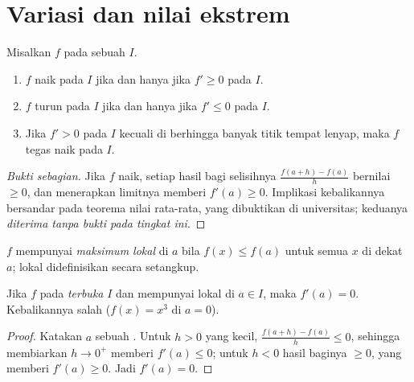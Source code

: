 \section{Variasi dan nilai ekstrem}

\begin{theorem}\label{thm:g12:deriv:variations}
Misalkan $f$  pada sebuah  $I$.
\begin{enumerate}
  \item $f$ naik pada $I$ jika dan hanya jika $f' \geq 0$ pada $I$.
  \item $f$ turun pada $I$ jika dan hanya jika $f' \leq 0$ pada $I$.
  \item Jika $f' > 0$ pada $I$ kecuali di berhingga banyak titik tempat
         lenyap, maka $f$ tegas naik pada $I$.
\end{enumerate}
\end{theorem}

\begin{proof}[Bukti sebagian]
Jika $f$ naik, setiap hasil bagi selisihnya
$\frac{f(a+h)-f(a)}{h}$ bernilai $\geq 0$, dan menerapkan limitnya memberi
$f'(a) \geq 0$. Implikasi kebalikannya bersandar pada teorema nilai rata-rata,
yang dibuktikan di universitas; keduanya \emph{diterima tanpa bukti pada tingkat ini}.
\end{proof}

\begin{definition}\label{def:g12:deriv:extremum}
$f$ mempunyai \emph{maksimum lokal} di $a$ bila
$f(x) \leq f(a)$ untuk semua $x$ di dekat $a$;  lokal didefinisikan
secara setangkup.
\end{definition}

\begin{proposition}\label{prop:g12:deriv:critical}
Jika $f$  pada  \emph{terbuka} $I$ dan mempunyai
 lokal di $a \in I$, maka $f'(a) = 0$. Kebalikannya salah
($f(x) = x^3$ di $a = 0$).
\end{proposition}

\begin{proof}
Katakan $a$ sebuah . Untuk $h > 0$ yang kecil,
$\frac{f(a+h)-f(a)}{h} \leq 0$, sehingga membiarkan $h \to 0^+$ memberi
$f'(a) \leq 0$; untuk $h < 0$ hasil baginya $\geq 0$, yang memberi
$f'(a) \geq 0$. Jadi $f'(a) = 0$.
\end{proof}

